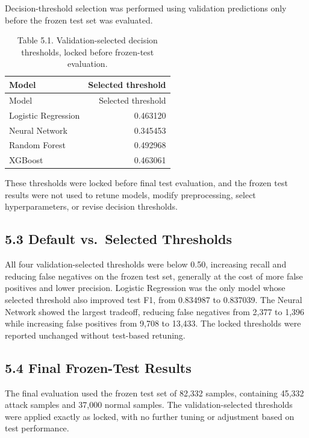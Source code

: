 \documentclass[
  canadian,
  12pt,
]{article}
\let\reportOrigSubsection\subsection
\renewcommand{\subsection}{\par\Needspace*{8\baselineskip}\reportOrigSubsection}%
\begin{document}
Decision-threshold selection was performed using validation predictions
only before the frozen test set was evaluated.

\begin{longtable}[]{@{}lr@{}}
\caption[Table 5.1. Validation-selected decision thresholds.]{Table 5.1. Validation-selected decision thresholds, locked
before frozen-test evaluation.}\tabularnewline
\toprule\noalign{}
Model & Selected threshold \\
\midrule\noalign{}
\endfirsthead
\toprule\noalign{}
Model & Selected threshold \\
\midrule\noalign{}
\endhead
\bottomrule\noalign{}
\endlastfoot
Logistic Regression & 0.463120 \\
Neural Network & 0.345453 \\
Random Forest & 0.492968 \\
XGBoost & 0.463061 \\
\end{longtable}

These thresholds were locked before final test evaluation, and the
frozen test results were not used to retune models, modify
preprocessing, select hyperparameters, or revise decision thresholds.

\subsection[\texorpdfstring{\numberline{5.3}Default vs.~Selected Thresholds}{5.3 Default vs.~Selected Thresholds}]{5.3 Default vs.~Selected Thresholds}\label{sec-5-3}

All four validation-selected thresholds were below 0.50, increasing
recall and reducing false negatives on the frozen test set, generally at
the cost of more false positives and lower precision. Logistic
Regression was the only model whose selected threshold also improved
test F1, from 0.834987 to 0.837039. The Neural Network showed the
largest tradeoff, reducing false negatives from 2,377 to 1,396 while
increasing false positives from 9,708 to 13,433. The locked thresholds
were reported unchanged without test-based retuning.

\subsection[\texorpdfstring{\numberline{5.4}Final Frozen-Test Results}{5.4 Final Frozen-Test Results}]{5.4 Final Frozen-Test Results}\label{sec-5-4}

The final evaluation used the frozen test set of 82,332 samples,
containing 45,332 attack samples and 37,000 normal samples. The
validation-selected thresholds were applied exactly as locked, with no
further tuning or adjustment based on test performance.
\end{document}
